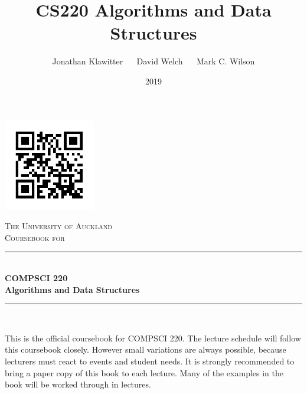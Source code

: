 \documentclass[11pt,oneside]{memoir}
\theoremstyle{definition}
\numberwithin{Lemma}{chapter}
\numberwithin{Exercise}{section}
\theoremstyle{remark}
\begin{document}
   


\title{CS220 Algorithms and Data Structures}
\author{Jonathan Klawitter $\quad$ David Welch $\quad$ Mark C. Wilson}
\date{2019}

\begin{titlingpage}
\newcommand{\HRule}{\rule{\linewidth}{0.5mm}}
\setlength{\droptitle}{30pt} 
\begin{adjustwidth*}{1cm}{-2cm}
\centering

\hfill \includegraphics[height = 4cm]{qrcode}

\vspace*{0.4cm}
\textsc{\LARGE The University of Auckland}\\[3cm]

\textsc{\Large Coursebook for}\\[0.4cm]

\HRule\\[0.5cm]
\Huge{\bfseries COMPSCI 220\\ 
Algorithms and Data Structures}\\[0.1cm]
\HRule\\[0.5cm]
\Large{\thedate}

\vspace*{2.4cm}
\LARGE{\theauthor}

\end{adjustwidth*}
\end{titlingpage}



\setcounter{page}{1}






{}

\thispagestyle{empty}
This is the official coursebook for COMPSCI 220. The lecture schedule will follow this coursebook closely. However small variations are always possible, because lecturers must react to events and student needs. It is strongly recommended to bring a paper copy of this book to each lecture. Many of the examples in the book will be worked through in lectures.
\end{document}
